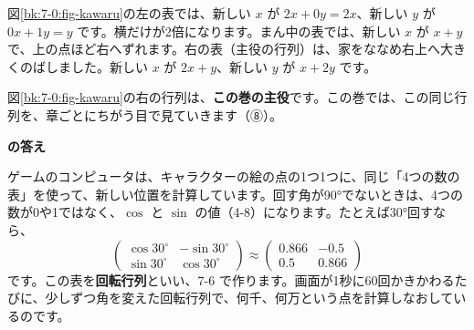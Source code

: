 \begin{bkfigure}
\label{bk:7-0:fig-kawaru}
\end{bkfigure}

図\ref{bk:7-0:fig-kawaru}の左の表では、新しい $x$ が $2x+0y=2x$、新しい $y$ が $0x+1y=y$ です。横だけが2倍になります。まん中の表では、新しい $x$ が $x+y$ で、上の点ほど右へずれます。右の表（主役の行列）は、家をななめ右上へ大きくのばしました。新しい $x$ が $2x+y$、新しい $y$ が $x+2y$ です。

図\ref{bk:7-0:fig-kawaru}の右の行列は、\textbf{この巻の主役}です。この巻では、この同じ行列を、章ごとにちがう目で見ていきます（⑧）。


\label{bk:7-0:kotae}\noindent\textbf{\bkhatenaref の答え}\par
ゲームのコンピュータは、キャラクターの絵の点の1つ1つに、同じ「4つの数の表」を使って、新しい位置を計算しています。回す角が90°でないときは、4つの数が0や1ではなく、$\cos$ と $\sin$ の値（4-8）になります。たとえば30°回すなら、
\[ \begin{pmatrix} \cos30^\circ & -\sin30^\circ\\ \sin30^\circ & \cos30^\circ \end{pmatrix}\approx\begin{pmatrix} 0.866 & -0.5\\ 0.5 & 0.866 \end{pmatrix} \]
です。この表を\textbf{回転行列}といい、7-6 で作ります。画面が1秒に60回かきかわるたびに、少しずつ角を変えた回転行列で、何千、何万という点を計算しなおしているのです。

